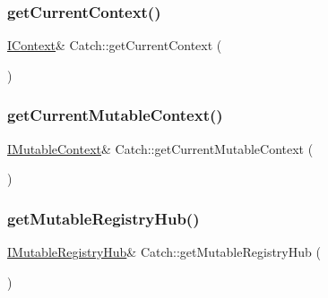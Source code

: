 \mbox{\label{namespace_catch_ad517cca9b21deb79101e90e5508dd161}} 
\subsubsection{\texorpdfstring{get\+Current\+Context()}{getCurrentContext()}}
{\footnotesize\ttfamily \mbox{\hyperlink{struct_catch_1_1_i_context}{I\+Context}}\& Catch\+::get\+Current\+Context (\begin{DoxyParamCaption}{ }\end{DoxyParamCaption})}

\mbox{\label{namespace_catch_af7bb0c32ab2453d2f53e92a96d15360e}} 
\subsubsection{\texorpdfstring{get\+Current\+Mutable\+Context()}{getCurrentMutableContext()}}
{\footnotesize\ttfamily \mbox{\hyperlink{struct_catch_1_1_i_mutable_context}{I\+Mutable\+Context}}\& Catch\+::get\+Current\+Mutable\+Context (\begin{DoxyParamCaption}{ }\end{DoxyParamCaption})}

\mbox{\label{namespace_catch_ac9ddcc6d66079add9cb2a3140b8ae51e}} 
\subsubsection{\texorpdfstring{get\+Mutable\+Registry\+Hub()}{getMutableRegistryHub()}}
{\footnotesize\ttfamily \mbox{\hyperlink{struct_catch_1_1_i_mutable_registry_hub}{I\+Mutable\+Registry\+Hub}}\& Catch\+::get\+Mutable\+Registry\+Hub (\begin{DoxyParamCaption}{ }\end{DoxyParamCaption})}

\mbox{\label{namespace_catch_ac24b072979540bfd922e7d46e899f46f}} 
